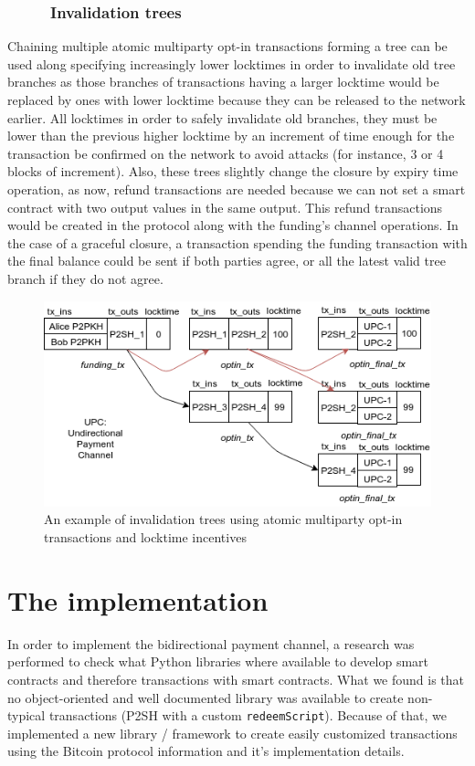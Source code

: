 \documentclass[12pt,journal,compsoc]{IEEEtran}
\newcommand{\code}[1]{\texttt{#1}}
\begin{document}
\subsubsection{\ \ \ \ \ Invalidation trees}
Chaining multiple atomic multiparty opt-in transactions forming a tree can be used along specifying increasingly lower locktimes in order to invalidate old tree branches as those branches of transactions having a larger locktime would be replaced by ones with lower locktime because they can be released to the network earlier. All locktimes in order to safely invalidate old branches, they must be lower than the previous higher locktime by an increment of time enough for the transaction be confirmed on the network to avoid attacks (for instance, 3 or 4 blocks of increment). Also, these trees slightly change the closure by expiry time operation, as now, refund transactions are needed because we can not set a smart contract with two output values in the same output. This refund transactions would be created in the protocol along with the funding's channel operations. In the case of a graceful closure, a transaction spending the funding transaction with the final balance could be sent if both parties agree, or all the latest valid tree branch if they do not agree.
\begin{figure}[h]
    \begin{center}
        \includegraphics[width=\linewidth]{invalidation-trees}
        \caption{An example of invalidation trees using atomic multiparty opt-in transactions and locktime incentives}
    \end{center}
\end{figure}
\section{The implementation}
In order to implement the bidirectional payment channel, a research was performed to check what Python libraries where available to develop smart contracts and therefore transactions with smart contracts. What we found is that no object-oriented and well documented library was available to create non-typical transactions (P2SH with a custom \code{redeemScript}). Because of that, we implemented a new library / framework to create easily customized transactions using the Bitcoin protocol information and it's implementation details\cite{bitcoin-org-developer:online, bitcoin-wiki-proto:online}.
\end{document}
